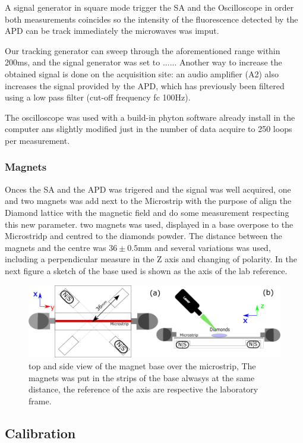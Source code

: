  A signal generator in square mode trigger the SA and the Oscilloscope in order both measurements coincides so the intensity of the fluorescence detected by the APD can be track immediately the microwaves was imput.
 
 Our tracking generator can sweep through the aforementioned range within 200ms, and  the signal generator was set to ......  Another way to increase the obtained signal is done on the acquisition site: an audio ampliﬁer (A2) also increases the signal provided by the APD, which has previously been ﬁltered using a low pass ﬁlter (cut-oﬀ frequency fc 100Hz). 
 
 The oscilloscope was used with a build-in phyton software already install in the computer ans slightly modified just in the number of data acquire to 250 loops per measurement.
 
 \subsubsection{Magnets}
 
 Onces the SA and the APD was trigered and the signal was well acquired, one and two magnets was add next to the Microstrip with the purpose of align the Diamond lattice with the magnetic field  and do some measurement respecting this new parameter.
two magnets was used, displayed in a base overpose to the Microstridp and centred to the diamonds powder. The distance between the magnets and the centre was $36 \pm 0.5 \mathrm{mm}$ and several variations was used, including a perpendicular measure in the Z axis and changing of  polarity.  In the next figure a sketch of the base used is shown as the axis of the lab reference.
\begin{figure}
	\centering
	\includegraphics[width=0.7\linewidth]{../figures/magnets}
	\caption[mag]{top and side view of the magnet base over the microstrip, The magnets was put in the strips of the base alwasys at the same distance, the reference of the axis are respective the laboratory frame.}
	\label{fig:magnets}
\end{figure}


\subsection{Calibration}

